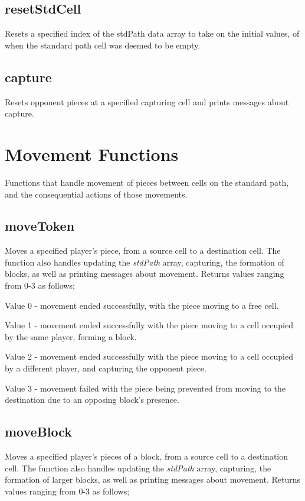 \documentclass{article}
\begin{document}
\subsection{resetStdCell}
Resets a specified index of the stdPath data array to take on the initial values, of when the standard path cell was deemed to be empty.

\subsection{capture}
Resets opponent pieces at a specified capturing cell and prints messages about capture.

\section{Movement Functions}
Functions that handle movement of pieces between cells on the standard path, and the consequential actions of those movements.
\subsection{moveToken}
Moves a specified player's piece, from a source cell to a destination cell. The function also handles updating the \textit{stdPath} array, capturing, the formation of blocks, as well as printing messages about movement. Returns values ranging from 0-3 as follows;

Value 0 - movement ended successfully, with the piece moving to a free cell. 

Value 1 - movement ended successfully with the piece moving to a cell occupied by the same player, forming a block.

Value 2 - movement ended successfully with the piece moving to a cell occupied by a different player, and capturing the opponent piece.

Value 3 - movement failed with the piece being prevented from moving to the destination due to an opposing block's presence.

\subsection{moveBlock}
Moves a specified player's pieces of a block, from a source cell to a destination cell. The function also handles updating the \textit{stdPath} array, capturing, the formation of larger blocks, as well as printing messages about movement. Returns values ranging from 0-3 as follows;
\end{document}
